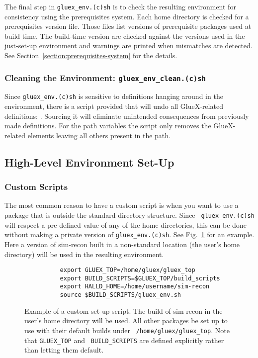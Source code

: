 \documentclass[12pt]{article}
\begin{document}
The final step in {\tt gluex\_env.(c)sh} is to check the resulting
environment for consistency using the prerequisites system. Each home
directory is checked for a prerequisites version file. Those files
list versions of prerequisite packages used at build time. The
build-time version are checked against the versions used in the
just-set-up environment and warnings are printed when mismatches are
detected. See Section~\ref{section:prerequisites-system} for the
details.

\subsubsection{Cleaning the Environment: {\tt gluex\_env\_clean.(c)sh}}

Since {\tt gluex\_env.(c)sh} is sensitive to definitions hanging
around in the environment, there is a script provided that will undo
all GlueX-related definitions: . Sourcing
it will eliminate unintended consequences from previously made
definitions. For the path variables the script only removes the
GlueX-related elements leaving all others present in the path.

\subsection{High-Level Environment Set-Up}

\subsubsection{Custom Scripts}\label{section:custom-scripts}

The most common reason to have a custom script is when you want to use
a package that is outside the standard directory structure. Since {\tt
  gluex\_env.(c)sh} will respect a pre-defined value of any of the
home directories, this can be done without making a private version of
{\tt gluex\_env.(c)sh}. See Fig.~\ref{figure:custom-script} for an
example. Here a version of sim-recon built in a non-standard location
(the user's home directory) will be used in the resulting environment.

\begin{figure}
\begin{verbatim}
          export GLUEX_TOP=/home/gluex/gluex_top
          export BUILD_SCRIPTS=$GLUEX_TOP/build_scripts
          export HALLD_HOME=/home/username/sim-recon
          source $BUILD_SCRIPTS/gluex_env.sh
\end{verbatim}
\caption{Example of a custom set-up script. The build of sim-recon in
  the user's home directory will be used. All other packages be set up
  to use with their default builds under {\tt
    /home/gluex/gluex\_top}. Note that {\tt GLUEX\_TOP} and {\tt
  BUILD\_SCRIPTS} are defined explicitly rather than letting them
default.}\label{figure:custom-script}
\end{figure}
\end{document}
